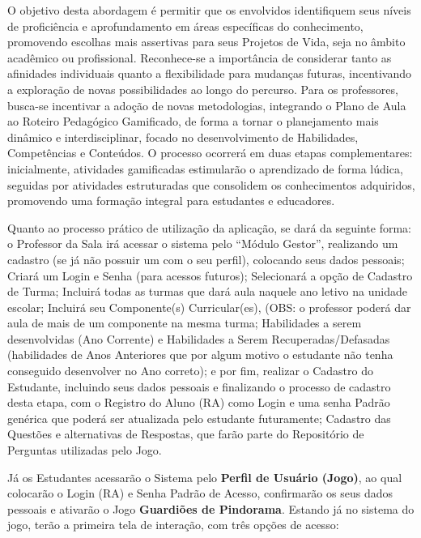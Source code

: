 O objetivo desta abordagem é permitir que os envolvidos identifiquem seus níveis de proficiência e aprofundamento em áreas específicas do conhecimento, promovendo escolhas mais assertivas para seus Projetos de Vida, seja no âmbito acadêmico ou profissional. Reconhece-se a importância de considerar tanto as afinidades individuais quanto a flexibilidade para mudanças futuras, incentivando a exploração de novas possibilidades ao longo do percurso. Para os professores, busca-se incentivar a adoção de novas metodologias, integrando o Plano de Aula ao Roteiro Pedagógico Gamificado, de forma a tornar o planejamento mais dinâmico e interdisciplinar, focado no desenvolvimento de Habilidades, Competências e Conteúdos. O processo ocorrerá em duas etapas complementares: inicialmente, atividades gamificadas estimularão o aprendizado de forma lúdica, seguidas por atividades estruturadas que consolidem os conhecimentos adquiridos, promovendo uma formação integral para estudantes e educadores. 

Quanto ao processo prático de utilização da aplicação, se dará da seguinte forma: o Professor da Sala irá acessar o sistema pelo “Módulo Gestor”, realizando um cadastro (se já não possuir um com o seu perfil), colocando seus dados pessoais; Criará um Login e Senha (para acessos futuros); Selecionará a opção de Cadastro de Turma; Incluirá todas as turmas que dará aula naquele ano letivo na unidade escolar; Incluirá seu Componente(s) Curricular(es), (OBS: o professor poderá dar aula de mais de um componente na mesma turma; Habilidades a serem desenvolvidas (Ano Corrente) e Habilidades a Serem Recuperadas/Defasadas (habilidades de Anos Anteriores que por algum motivo o estudante não tenha conseguido desenvolver no Ano correto); e por fim, realizar o Cadastro do Estudante, incluindo seus dados pessoais e finalizando o processo de cadastro desta etapa, com o Registro do Aluno (RA) como Login e uma senha Padrão genérica que poderá ser atualizada pelo estudante futuramente; Cadastro das Questões e alternativas de Respostas, que farão parte do Repositório de Perguntas utilizadas pelo Jogo. 

Já os Estudantes acessarão o Sistema pelo \textbf{Perfil de Usuário (Jogo)}, ao qual colocarão o Login (RA) e Senha Padrão de Acesso, confirmarão os seus dados pessoais e ativarão o Jogo \textbf{Guardiões de Pindorama}. Estando já no sistema do jogo, terão a primeira tela de interação, com três opções de acesso:  

